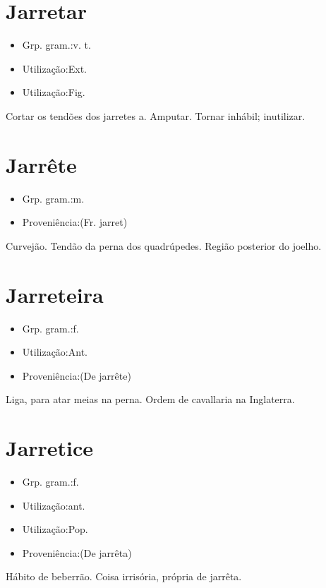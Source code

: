 \documentclass{article}
\begin{document}
\section{Jarretar}
\begin{itemize}
\item {Grp. gram.:v. t.}
\end{itemize}
\begin{itemize}
\item {Utilização:Ext.}
\end{itemize}
\begin{itemize}
\item {Utilização:Fig.}
\end{itemize}
Cortar os tendões dos jarretes a.
Amputar.
Tornar inhábil; inutilizar.
\section{Jarrête}
\begin{itemize}
\item {Grp. gram.:m.}
\end{itemize}
\begin{itemize}
\item {Proveniência:(Fr. \textunderscore jarret\textunderscore )}
\end{itemize}
Curvejão.
Tendão da perna dos quadrúpedes.
Região posterior do joelho.
\section{Jarreteira}
\begin{itemize}
\item {Grp. gram.:f.}
\end{itemize}
\begin{itemize}
\item {Utilização:Ant.}
\end{itemize}
\begin{itemize}
\item {Proveniência:(De \textunderscore jarrête\textunderscore )}
\end{itemize}
Liga, para atar meias na perna.
Ordem de cavallaria na Inglaterra.
\section{Jarretice}
\begin{itemize}
\item {Grp. gram.:f.}
\end{itemize}
\begin{itemize}
\item {Utilização:ant.}
\end{itemize}
\begin{itemize}
\item {Utilização:Pop.}
\end{itemize}
\begin{itemize}
\item {Proveniência:(De \textunderscore jarrêta\textunderscore )}
\end{itemize}
Hábito de beberrão.
Coisa irrisória, própria de jarrêta.
\end{document}
